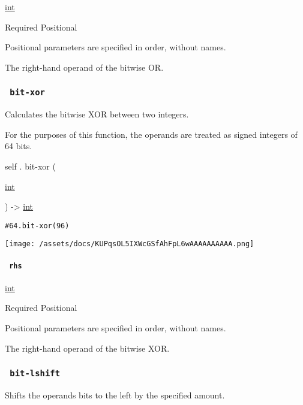 \href{/docs/reference/foundations/int/}{int}

{Required} {{ Positional }}

\label{definitions-bit-or-rhs-positional-tooltip}
Positional parameters are specified in order, without names.

The right-hand operand of the bitwise OR.

\subsubsection{\texorpdfstring{\texttt{\ bit-xor\ }}{ bit-xor }}\label{definitions-bit-xor}

Calculates the bitwise XOR between two integers.

For the purposes of this function, the operands are treated as signed
integers of 64 bits.

self { . } { bit-xor } (

{ \href{/docs/reference/foundations/int/}{int} }

) -\textgreater{} \href{/docs/reference/foundations/int/}{int}

\begin{verbatim}
#64.bit-xor(96)
\end{verbatim}

\texttt{[image: /assets/docs/KUPqsOL5IXWcGSfAhFpL6wAAAAAAAAAA.png]}

\paragraph{\texorpdfstring{\texttt{\ rhs\ }}{ rhs }}\label{definitions-bit-xor-rhs}

\href{/docs/reference/foundations/int/}{int}

{Required} {{ Positional }}

\label{definitions-bit-xor-rhs-positional-tooltip}
Positional parameters are specified in order, without names.

The right-hand operand of the bitwise XOR.

\subsubsection{\texorpdfstring{\texttt{\ bit-lshift\ }}{ bit-lshift }}\label{definitions-bit-lshift}

Shifts the operand\textquotesingle s bits to the left by the specified
amount.

